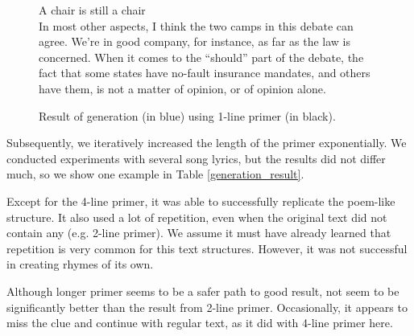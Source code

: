\begin{figure}[htb]\centering
	A chair is still a chair \\
	\color{blue}In most other aspects, I think the two camps in this debate can agree. We're in good company, for instance, as far as the law is concerned. When it comes to the ``should'' part of the debate, the fact that some states have no-fault insurance mandates, and others have them, is not a matter of opinion, or of opinion alone. \\
	\endminipage\hfill
	\caption{Result of generation (in blue) using  1-line primer (in black).} \label{fig_1line_primer}
\end{figure} 

Subsequently, we iteratively increased the length of the primer exponentially. We conducted experiments with several song lyrics, but the results did not differ  much, so we  show one example in Table \ref{generation_result}.

Except for the 4-line primer, it was able to successfully replicate the poem-like structure. It also used a lot of repetition, even when the original text did not contain any (e.g.  2-line primer). We assume\deleted{,} it must have already learned that repetition is very common for this  text structures. However, it was not successful in creating rhymes of its own.

Although longer primer seems to be a safer path to good result,  not seem to be significantly better than the result from  2-line primer. Occasionally, it appears to miss the clue and continue with regular text, as it did with  4-line primer here.


